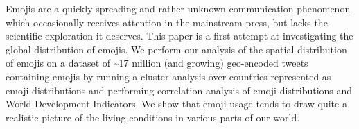 Emojis are a quickly spreading and rather unknown communication phenomenon which occasionally receives attention in the mainstream press, but lacks the scientific exploration it deserves. This paper is a first attempt at investigating the global distribution of emojis. We perform our analysis of the spatial distribution of emojis on a dataset of {\textasciitilde}17 million (and growing) geo-encoded tweets containing emojis by running a cluster analysis over countries represented as emoji distributions and performing correlation analysis of emoji distributions and World Development Indicators. We show that emoji usage tends to draw quite a realistic picture of the living conditions in various parts of our world.
